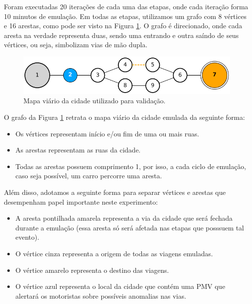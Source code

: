 Foram executadas 20 iterações de cada uma das etapas, onde cada iteração forma 10 minutos de emulação.
Em todas as etapas, utilizamos um grafo com 8 vértices e 16 arestas, como pode ser visto na Figura \ref{fig:mapa_validacao}.
O grafo é direcionado, onde cada aresta na verdade representa duas, sendo uma entrando e outra saíndo de seus vértices, ou seja, simbolizam vias de mão dupla.

\begin{figure}[ht]
	\centering
	\includegraphics[width=\textwidth]{figuras/mapa_validacao.png}
	\caption{Mapa viário da cidade utilizado para validação.}
	\label{fig:mapa_validacao}
\end{figure}

O grafo da Figura \ref{fig:mapa_validacao} retrata o mapa viário da cidade emulada da seguinte forma:

\begin{itemize}
    \item Os vértices representam início e/ou fim de uma ou mais ruas.

    \item As arestas representam as ruas da cidade.

    \item Todas as arestas possuem comprimento 1, por isso, a cada ciclo de emulação, caso seja possível, um carro percorre uma aresta.
\end{itemize}

Além disso, adotamos a seguinte forma para separar vértices e arestas que desempenham papel importante neste experimento:

\begin{itemize}
    \item A aresta pontilhada amarela representa a via da cidade que será fechada durante a emulação (essa aresta só será afetada nas etapas que posssuem tal evento).

    \item O vértice cinza representa a origem de todas as viagens emuladas.

    \item O vértice amarelo representa o destino das viagens.

    \item O vértice azul representa o local da cidade que contém uma PMV que alertará os motoristas sobre possíveis anomalias nas vias.
\end{itemize}

